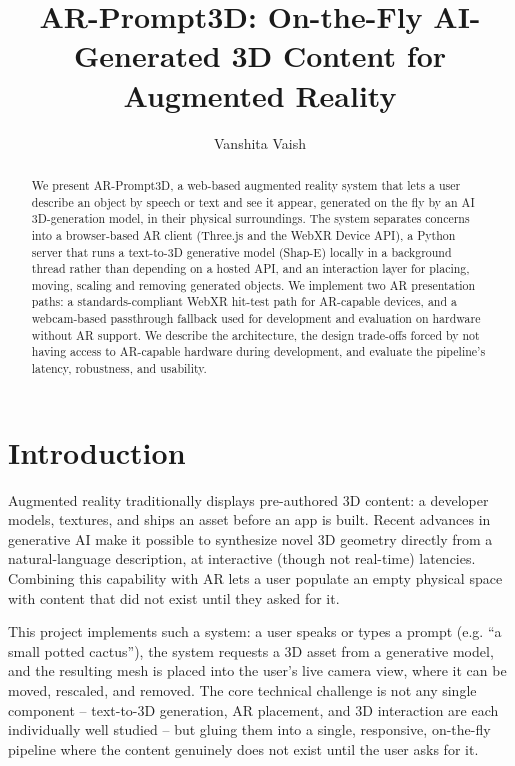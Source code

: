 \documentclass[sigconf,nonacm]{acmart}
\begin{document}
\title{AR-Prompt3D: On-the-Fly AI-Generated 3D Content for Augmented Reality}

\author{Vanshita Vaish}

\begin{abstract}
We present AR-Prompt3D, a web-based augmented reality system that lets a
user describe an object by speech or text and see it appear, generated on
the fly by an AI 3D-generation model, in their physical surroundings. The
system separates concerns into a browser-based AR client (Three.js and the
WebXR Device API), a Python server that runs a text-to-3D generative model
(Shap-E) locally in a background thread rather than depending on a
hosted API, and an interaction layer for placing, moving, scaling and
removing generated objects. We implement two AR presentation paths: a
standards-compliant WebXR hit-test path for AR-capable devices, and a
webcam-based passthrough fallback used for development and evaluation on
hardware without AR support. We describe the architecture, the design
trade-offs forced by not having access to AR-capable hardware during
development, and evaluate the pipeline's latency, robustness, and
usability.
\end{abstract}

\maketitle

\section{Introduction}
Augmented reality traditionally displays pre-authored 3D content: a
developer models, textures, and ships an asset before an app is built.
Recent advances in generative AI make it possible to synthesize novel 3D
geometry directly from a natural-language description, at interactive
(though not real-time) latencies. Combining this capability with AR lets a
user populate an empty physical space with content that did not exist
until they asked for it.

This project implements such a system: a user speaks or types a prompt
(e.g. ``a small potted cactus''), the system requests a 3D asset from a
generative model, and the resulting mesh is placed into the user's live
camera view, where it can be moved, rescaled, and removed. The core
technical challenge is not any single component -- text-to-3D generation,
AR placement, and 3D interaction are each individually well studied -- but
gluing them into a single, responsive, on-the-fly pipeline where the
content genuinely does not exist until the user asks for it.
\end{document}
